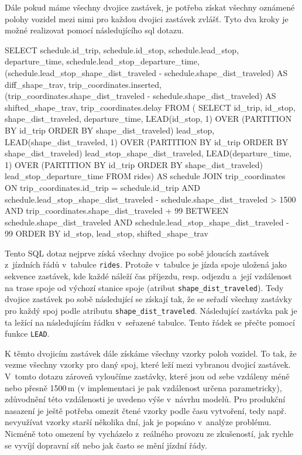 \bigbreak


 Dále pokud máme všechny dvojice zastávek, je potřeba získat všechny oznámené polohy vozidel mezi nimi pro každou dvojici zastávek zvlášť. Tyto dva kroky je možné realizovat pomocí následujícího \gls{sql} dotazu.


\begin{code}[frame=none]
SELECT schedule.id_trip,
  schedule.id_stop,
  schedule.lead_stop,
  departure_time,
  schedule.lead_stop_departure_time,
  (schedule.lead_stop_shape_dist_traveled -
    schedule.shape_dist_traveled)
      AS diff_shape_trav,
  trip_coordinates.inserted,
  (trip_coordinates.shape_dist_traveled -
    schedule.shape_dist_traveled)
      AS shifted_shape_trav,
  trip_coordinates.delay
FROM (
  SELECT id_trip, id_stop, shape_dist_traveled, departure_time,
    LEAD(id_stop, 1) OVER (PARTITION BY id_trip
	  ORDER BY shape_dist_traveled) lead_stop,
    LEAD(shape_dist_traveled, 1) OVER (PARTITION BY id_trip
	  ORDER BY shape_dist_traveled) lead_stop_shape_dist_traveled,
    LEAD(departure_time, 1) OVER (PARTITION BY id_trip
	  ORDER BY shape_dist_traveled) lead_stop_departure_time
  FROM rides) AS schedule
JOIN trip_coordinates
ON trip_coordinates.id_trip = schedule.id_trip AND
  schedule.lead_stop_shape_dist_traveled -
    schedule.shape_dist_traveled > 1500 AND
  trip_coordinates.shape_dist_traveled + 99
    BETWEEN schedule.shape_dist_traveled AND
  schedule.lead_stop_shape_dist_traveled - 99
ORDER BY id_stop, lead_stop, shifted_shape_trav
\end{code}


Tento SQL dotaz nejprve získá všechny dvojice po sobě jdoucích zastávek z~jízdních řádů v~tabulce \verb-rides-. Protože v~tabulce je jízda spoje uložená jako sekvence zastávek, kde každé náleží čas příjezdu, resp. odjezdu a~její vzdálenost na trase spoje od výchozí stanice spoje (atribut \verb-shape_dist_traveled-). Tedy dvojice zastávek po sobě následující se získají tak, že se seřadí všechny zastávky pro každý spoj podle atributu \verb-shape_dist_traveled-. Následující zastávka pak je ta ležící na následujícím řádku v~seřazené tabulce. Tento řádek se přečte pomocí funkce \verb-LEAD-.


\bigbreak


K těmto dvojicím zastávek dále získáme všechny vzorky poloh vozidel. To tak, že vezme všechny vzorky pro daný spoj, které leží mezi vybranou dvojicí zastávek. V~tomto dotazu zároveň vyloučíme zastávky, které jsou od sebe vzdáleny méně nebo přesně 1500\,m (v implementaci je pak vzdálenost určena parametricky), zdůvodnění této vzdálenosti je uvedeno výše v~návrhu modelů. Pro produkční nasazení je ještě potřeba omezit čtené vzorky podle času vytvoření, tedy např. nevyužívat vzorky starší několika dní, jak je popsáno v~analýze problému. Nicméně toto omezení by vycházelo z~reálného provozu ze zkušeností, jak rychle se vyvíjí dopravní síť nebo jak často se mění jízdní řády.


